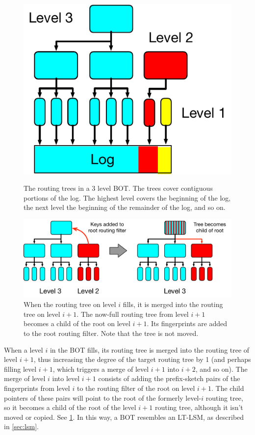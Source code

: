 \begin{figure}[h!]
	\centering
	\begin{minipage}[t]{0.4\textwidth}
		\centering
		\includegraphics[height=0.5\textwidth]{figures/routing_tree.pdf}
		\caption{The routing trees in a 3 level BOT. The trees
                  cover contiguous portions of the log.  The highest
                  level covers the beginning of the log, the next
                  level the beginning of the remainder of the log, and so on.}
		\label{fig:routing_tree}
	\end{minipage}\hfill
	\begin{minipage}[t]{0.55\textwidth}
		\centering
		\includegraphics[height=0.4\textwidth]{figures/routing_tree_merge.pdf}
		\caption{When the routing tree on level $i$ fills, it is merged into
			the routing tree on level $i+1$. The now-full routing tree from
			level $i+1$ becomes a child of the root on level $i+1$. Its
			fingerprints are added to the root routing filter. Note that the
			tree is not moved.}
		\label{fig:routing_tree_merge}
	\end{minipage}
\end{figure}

When a level $i$ in the BOT fills, its routing tree is merged into the routing
tree of level $i+1$, thus increasing the degree of the target routing tree by 1 (and
perhaps filling level $i+1$, which triggers a merge of level $i+1$ into
$i+2$, and so on). The merge of level $i$ into level $i+1$ consists of adding
the prefix-sketch pairs of the fingerprints from level $i$ to the routing
filter of the root on level $i+1$. The child pointers of these pairs will point
to the root of the formerly level-$i$ routing tree, so it becomes a child of
the root of the level $i+1$ routing tree, although it isn't moved or copied.
See \cref{fig:routing_tree_merge}. In this way, a BOT resembles an LT-LSM, as
described in \cref{sec:lsm}.

